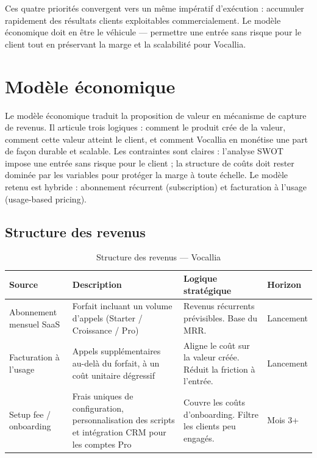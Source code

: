 Ces quatre priorités convergent vers un même impératif d'exécution : accumuler rapidement des résultats clients exploitables commercialement. Le modèle économique doit en être le véhicule --- permettre une entrée sans risque pour le client tout en préservant la marge et la scalabilité pour Vocallia.

\section{Modèle économique}
\label{section3.5}

Le modèle économique traduit la proposition de valeur en mécanisme de capture de revenus. Il articule trois logiques : comment le produit crée de la valeur, comment cette valeur atteint le client, et comment Vocallia en monétise une part de façon durable et scalable. Les contraintes sont claires : l'analyse SWOT impose une entrée sans risque pour le client ; la structure de coûts doit rester dominée par les variables pour protéger la marge à toute échelle. Le modèle retenu est hybride : abonnement récurrent (subscription) et facturation à l'usage (usage-based pricing).

\subsection{Structure des revenus}
\label{section3.5.1}

\begin{table}[H]
\centering
\caption{Structure des revenus --- Vocallia}
\vspace{4pt}
\begin{tabularx}{\textwidth}{|>{\raggedright\arraybackslash}p{2.5cm}|>{\raggedright\arraybackslash}X|>{\raggedright\arraybackslash}X|>{\raggedright\arraybackslash}p{1.8cm}|}
\hline
\textbf{Source} & \textbf{Description} & \textbf{Logique stratégique} & \textbf{Horizon} \\
\hline
Abonnement mensuel SaaS & Forfait incluant un volume d'appels (Starter / Croissance / Pro) & Revenus récurrents prévisibles. Base du MRR. & Lancement \\
\hline
Facturation à l'usage & Appels supplémentaires au-delà du forfait, à un coût unitaire dégressif & Aligne le coût sur la valeur créée. Réduit la friction à l'entrée. & Lancement \\
\hline
Setup fee / onboarding & Frais uniques de configuration, personnalisation des scripts et intégration CRM pour les comptes Pro & Couvre les coûts d'onboarding. Filtre les clients peu engagés. & Mois 3+ \\
\hline
\end{tabularx}
\end{table}

